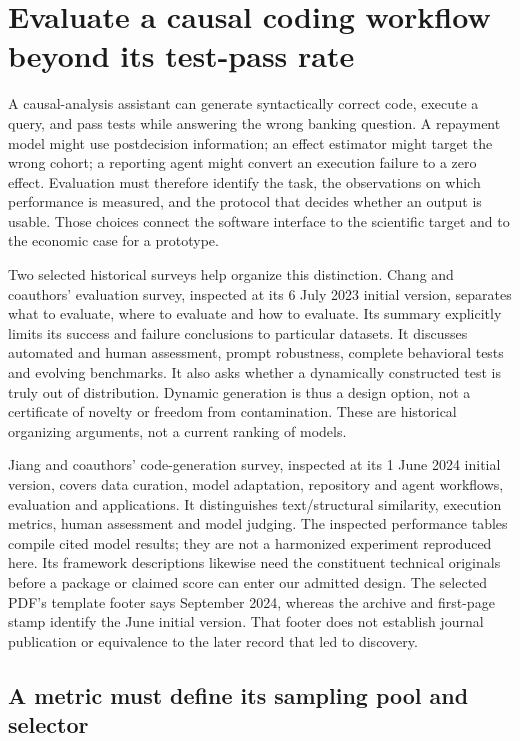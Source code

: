 \section{Evaluate a causal coding workflow beyond its test-pass rate}
\label{exec19:evalcode-scope}

A causal-analysis assistant can generate syntactically correct code, execute a
query, and pass tests while answering the wrong banking question. A repayment
model might use postdecision information; an effect estimator might target the
wrong cohort; a reporting agent might convert an execution failure to a zero
effect. Evaluation must therefore identify the task, the observations on which
performance is measured, and the protocol that decides whether an output is
usable. Those choices connect the software interface to the scientific target
and to the economic case for a prototype.

Two selected historical surveys help organize this distinction. Chang and
coauthors' evaluation survey, inspected at its 6 July 2023 initial version,
separates what to evaluate, where to evaluate and how to evaluate. Its summary
explicitly limits its success and failure conclusions to particular datasets.
It discusses automated and human assessment, prompt robustness, complete
behavioral tests and evolving benchmarks. It also asks whether a dynamically
constructed test is truly out of distribution. Dynamic generation is thus a
design option, not a certificate of novelty or freedom from contamination.
These are historical organizing arguments, not a current ranking of models.
\citep{exec19_surveys_evaluation}

Jiang and coauthors' code-generation survey, inspected at its 1 June 2024
initial version, covers data curation, model adaptation, repository and agent
workflows, evaluation and applications. It distinguishes text/structural
similarity, execution metrics, human assessment and model judging. The inspected
performance tables compile cited model results; they are not a harmonized
experiment reproduced here. Its framework descriptions likewise need the
constituent technical originals before a package or claimed score can enter
our admitted design. The selected PDF's template footer says September 2024,
whereas the archive and first-page stamp identify the June initial version.
That footer does not establish journal publication or equivalence to the later
record that led to discovery.\citep{exec19_surveys_code}

\subsection{A metric must define its sampling pool and selector}
\label{exec19:evalcode-selection}

